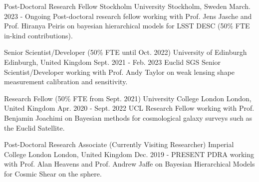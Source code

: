 

\begin{cventries}
  \cventry
    {Post-Doctoral Research Fellow} %
    {Stockholm University} %
    {Stockholm, Sweden} %
    {March. 2023 - Ongoing} %
    {
    Post-doctoral research fellow working with Prof. Jens Jasche and Prof. Hiranya Peiris on bayesian hierarchical models for LSST DESC (50\% FTE in-kind contributions).
    }

  \cventry
    {Senior Scientist/Developer (50\% FTE until Oct. 2022)} %
    {University of Edinburgh} %
    {Edinburgh, United Kingdom} %
    {Sept. 2021 - Feb. 2023} %
    {
    Euclid SGS Senior Scientist/Developer working with Prof. Andy Taylor on weak lensing shape measurement calibration and sensitivity.
    }

  \cventry
    {Research Fellow (50\% FTE from Sept. 2021)} %
    {University College London} %
    {London, United Kingdom} %
    {Apr. 2020 - Sept. 2022} %
    {
    UCL Research Fellow working with Prof. Benjamin Joachimi on Bayesian methods for cosmological galaxy surveys such as the Euclid Satellite.
    }
    
 \cventry
    {Post-Doctoral Research Associate (Currently Visiting Researcher)} %
    {Imperial College London} %
    {London, United Kingdom} %
    {Dec. 2019 - PRESENT} %
    {
    PDRA working with Prof. Alan Heavens and Prof. Andrew Jaffe on Bayesian Hierarchical Models for Cosmic Shear on the sphere.
    }


\end{cventries}
